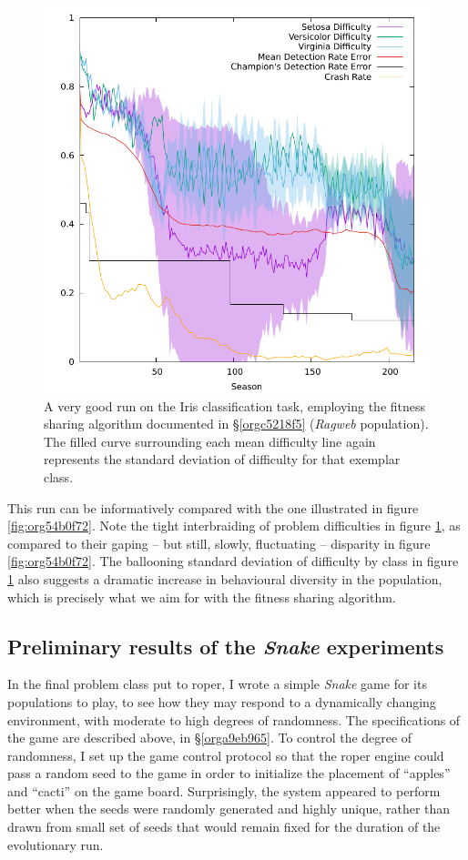 \documentclass[12pt,glossary]{dalthesis}
\begin{document}
\begin{figure}[htbp]
\centering
\includegraphics[width=.9\linewidth]{../images/plots/sharing.pdf}
\caption{\label{fig:org1346b2e}
A very good run on the Iris classification task, employing the fitness sharing algorithm documented in \S \ref{orgc5218f5} (\emph{Ragweb} population). The filled curve surrounding each mean difficulty line again represents the standard deviation of difficulty for that exemplar class.}
\end{figure}



This run can be informatively compared with the one illustrated in figure
\ref{fig:org54b0f72}. Note the tight interbraiding of problem difficulties in
figure \ref{fig:org1346b2e}, as compared to their gaping -- but still, slowly,
fluctuating -- disparity in figure \ref{fig:org54b0f72}. The ballooning standard
deviation of difficulty by class in figure \ref{fig:org1346b2e} also suggests
a dramatic increase in behavioural diversity in the population, which is
precisely what we aim for with the fitness sharing algorithm.


\subsection{Preliminary results of the \emph{Snake} experiments}
\label{sec:org9fefaa3}
\label{org5fa0856}

In the final problem class put to \gls{roper}, I wrote a simple \emph{Snake} game
\cite{snakefight} for its populations to play, to see how they may respond to a
dynamically changing environment, with moderate to high degrees of randomness.
The specifications of the game are described above, in \S \ref{orga9eb965}.
To control the degree of randomness, I set up the game control protocol so that
the \gls{roper} engine could pass a random seed to the game in order to initialize
the placement of ``apples'' and ``cacti'' on the game board. Surprisingly, the 
system appeared to perform better when the seeds were randomly generated and
highly unique, rather than drawn from small set of seeds that would remain fixed
for the duration of the evolutionary run. 
\end{document}
